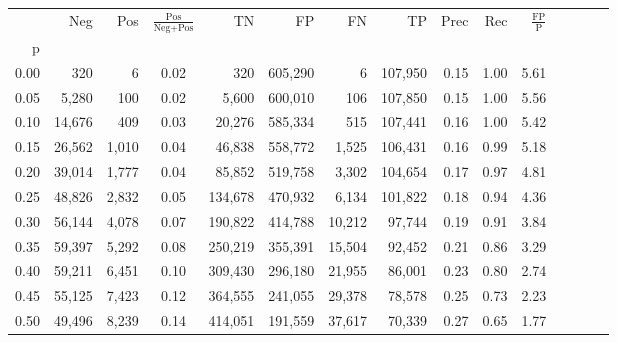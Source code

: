 \begin{tabular}{rrrcrrrrrrrrrrr}
\toprule
{} &     Neg &    Pos & $\frac{\text{Pos}}{\text{Neg}+\text{Pos}}$ &       TN &       FP &       FN &       TP &  Prec &   Rec & $\frac{\text{FP}}{\text{P}}$ \\
p    &         &        &                                            &          &          &          &          &       &       &                              \\
\midrule
0.00 &     320 &      6 &                                       0.02 &      320 &  605,290 &        6 &  107,950 &  0.15 &  1.00 &                         5.61 \\
0.05 &   5,280 &    100 &                                       0.02 &    5,600 &  600,010 &      106 &  107,850 &  0.15 &  1.00 &                         5.56 \\
0.10 &  14,676 &    409 &                                       0.03 &   20,276 &  585,334 &      515 &  107,441 &  0.16 &  1.00 &                         5.42 \\
0.15 &  26,562 &  1,010 &                                       0.04 &   46,838 &  558,772 &    1,525 &  106,431 &  0.16 &  0.99 &                         5.18 \\
0.20 &  39,014 &  1,777 &                                       0.04 &   85,852 &  519,758 &    3,302 &  104,654 &  0.17 &  0.97 &                         4.81 \\
0.25 &  48,826 &  2,832 &                                       0.05 &  134,678 &  470,932 &    6,134 &  101,822 &  0.18 &  0.94 &                         4.36 \\
0.30 &  56,144 &  4,078 &                                       0.07 &  190,822 &  414,788 &   10,212 &   97,744 &  0.19 &  0.91 &                         3.84 \\
0.35 &  59,397 &  5,292 &                                       0.08 &  250,219 &  355,391 &   15,504 &   92,452 &  0.21 &  0.86 &                         3.29 \\
0.40 &  59,211 &  6,451 &                                       0.10 &  309,430 &  296,180 &   21,955 &   86,001 &  0.23 &  0.80 &                         2.74 \\
0.45 &  55,125 &  7,423 &                                       0.12 &  364,555 &  241,055 &   29,378 &   78,578 &  0.25 &  0.73 &                         2.23 \\
0.50 &  49,496 &  8,239 &                                       0.14 &  414,051 &  191,559 &   37,617 &   70,339 &  0.27 &  0.65 &                         1.77 \\

\end{tabular}
